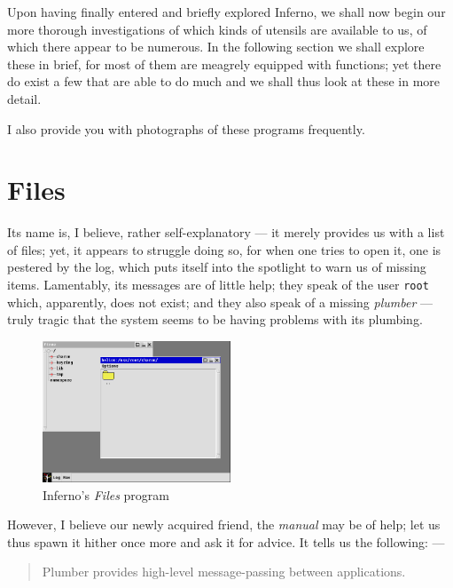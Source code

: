 \documentclass[a5paper,twoside,12pt]{report}
\begin{document}
  Upon having finally entered and briefly explored Inferno, we shall now begin our more thorough investigations of which kinds of utensils are available to us, of which there appear to be numerous. In the following section we shall explore these in brief, for most of them are meagrely equipped with functions; yet there do exist a few that are able to do much and we shall thus look at these in more detail.

  I also provide you with photographs of these programs frequently.

  \section*{Files}

  Its name is, I believe, rather self-explanatory — it merely provides us with a list of files; yet, it appears to struggle doing so, for when one tries to open it, one is pestered by the log, which puts itself into the spotlight to warn us of missing items. Lamentably, its messages are of little help; they speak of the user \texttt{root} which, apparently, does not exist; and they also speak of a missing \textit{plumber} — truly tragic that the system seems to be having problems with its plumbing.

  \begin{figure}
    \centering
    \includegraphics[width=0.5\textwidth]{imgs/files.png}
    \caption{Inferno's \textit{Files} program}
  \end{figure}

  However, I believe our newly acquired friend, the \textit{manual} may be of help; let us thus spawn it hither once more and ask it for advice. It tells us the following: —

  \begin{quote}
    Plumber provides high-level message-passing between applications.
  \end{quote}
\end{document}
